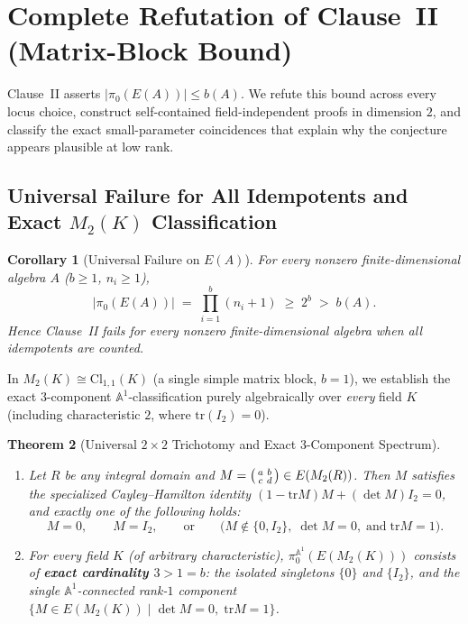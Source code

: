 \documentclass[11pt,a4paper]{article}
\newtheorem{theorem}{Theorem}[section]
\newtheorem{corollary}[theorem]{Corollary}
\theoremstyle{definition}
\newcommand{\Cl}{\mathrm{Cl}}
\newcommand{\tr}{\mathrm{tr}}
\newenvironment{psmallmatrix}{\left(\begin{smallmatrix}}{\end{smallmatrix}\right)}
\begin{document}
\section{Complete Refutation of Clause~II (Matrix-Block Bound)}

Clause~II asserts $|\pi_0(E(A))|\le b(A)$. We refute this bound across every locus choice,
construct self-contained field-independent proofs in dimension $2$, and classify the exact
small-parameter coincidences that explain why the conjecture appears plausible at low rank.

\subsection{Universal Failure for All Idempotents and Exact $M_2(K)$ Classification}

\begin{corollary}[Universal Failure on $E(A)$]\label{cor:all_fail}
For every nonzero finite-dimensional algebra $A$ ($b\ge 1$, $n_i\ge 1$),
\[
  \bigl|\pi_0(E(A))\bigr| \;=\; \prod_{i=1}^{b}(n_i + 1) \;\ge\; 2^b \;>\; b(A).
\]
Hence Clause~II fails for \emph{every} nonzero finite-dimensional algebra when all
idempotents are counted.
\end{corollary}

In $M_2(K)\cong \Cl_{1,1}(K)$ (a single simple matrix block, $b=1$), we establish the exact
$3$-component $\mathbb{A}^1$-classification purely algebraically over \emph{every} field $K$
(including characteristic $2$, where $\tr(I_2)=0$).

\begin{theorem}[Universal $2\times 2$ Trichotomy and Exact $3$-Component Spectrum]\label{thm:m2}
\leavevmode
\begin{enumerate}
  \setlength{\itemsep}{2pt}
  \item Let $R$ be any integral domain and $M=\begin{psmallmatrix}a&b\\ c&d\end{psmallmatrix}\in E(M_2(R))$.
    Then $M$ satisfies the specialized Cayley--Hamilton identity
    $(1-\tr M)M + (\det M)I_2 = 0$, and \emph{exactly one} of the following holds:
    \[
      M = 0, \qquad M = I_2, \qquad \text{or} \qquad
      \bigl(M\notin\{0,I_2\},\;\det M = 0,\;\text{and}\;\tr M = 1\bigr).
    \]
  \item For every field $K$ (of arbitrary characteristic), $\pi_0^{\mathbb{A}^1}(E(M_2(K)))$
    consists of \textbf{exact cardinality $3 > 1 = b$}: the isolated singletons $\{0\}$ and
    $\{I_2\}$, and the single $\mathbb{A}^1$-connected rank-$1$ component
    $\{M\in E(M_2(K))\mid \det M=0,\;\tr M=1\}$.
\end{enumerate}
\end{theorem}
\end{document}
